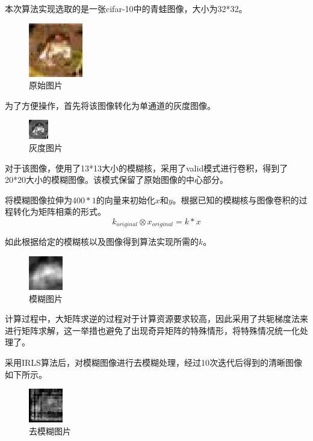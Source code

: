 \documentclass[journal]{IEEEtran}
\begin{document}
本次算法实现选取的是一张cifar-10中的青蛙图像，大小为32*32。

\begin{figure}[h]
	\centering
	\includegraphics{frog.eps}
	\caption{原始图片}
\end{figure}

为了方便操作，首先将该图像转化为单通道的灰度图像。


\begin{figure}[h]
	\centering
	\includegraphics[natwidth=30,natheight=30]{frog2.jpg}
	\caption{灰度图片}
\end{figure}

对于该图像，使用了13*13大小的模糊核，采用了valid模式进行卷积，得到了20*20大小的模糊图像。该模式保留了原始图像的中心部分。

将模糊图像拉伸为$400*1$的向量来初始化$x$和$y$。根据已知的模糊核与图像卷积的过程转化为矩阵相乘的形式。
\begin{equation}
k_{original}\otimes x_{original}= k*x
\end{equation}

如此根据给定的模糊核以及图像得到算法实现所需的$k$。

\begin{figure}[h]
	\centering
	\includegraphics{mohu.eps}
	\caption{模糊图片}
\end{figure}

计算过程中，大矩阵求逆的过程对于计算资源要求较高，因此采用了共轭梯度法来进行矩阵求解，这一举措也避免了出现奇异矩阵的特殊情形，将特殊情况统一化处理了。

采用IRLS算法后，对模糊图像进行去模糊处理，经过10次迭代后得到的清晰图像如下所示。

\begin{figure}[h]
	\centering
	\includegraphics{qingxi.eps}
	\caption{去模糊图片}
\end{figure}
\end{document}
